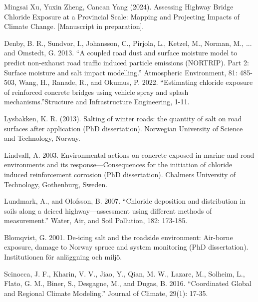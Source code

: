 \documentclass[12pt]{article}
\newcounter{refnum} %
\begin{document}
\begin{enumerate}[label={[\arabic*]}]
\item {} \label{ref7}
Mingsai Xu, Yuxin Zheng, Cancan Yang (2024). Assessing Highway Bridge Chloride Exposure at a Provincial Scale: Mapping and Projecting Impacts of Climate Change.  [Manuscript in preparation].

\item {} \label{ref8}
Denby, B. R., Sundvor, I., Johansson, C., Pirjola, L., Ketzel, M., Norman, M., ... and Omstedt, G. 2013. “A coupled road dust and surface moisture model to predict non-exhaust road traffic induced particle emissions (NORTRIP). Part 2: Surface moisture and salt impact modelling.” Atmospheric Environment, 81: 485-503, Wang, H., Ranade, R., and Okumus, P. 2022. “Estimating chloride exposure of reinforced concrete bridges using vehicle spray and splash mechanisms.”Structure and Infrastructure Engineering, 1-11. 

\item {} \label{ref9}
Lysbakken, K. R. (2013). Salting of winter roads: the quantity of salt on road surfaces after application (PhD dissertation). Norwegian University of Science and Technology, Norway.

\item {} \label{ref10}
Lindvall, A. 2003. Environmental actions on concrete exposed in marine and road environments and its response---Consequences for the initiation of chloride induced reinforcement corrosion (PhD dissertation). Chalmers University of Technology, Gothenburg, Sweden.

\item {} \label{ref11}
Lundmark, A., and Olofsson, B. 2007. “Chloride deposition and distribution in soils along a deiced highway---assessment using different methods of measurement.” Water, Air, and Soil Pollution, 182: 173-185.

\item {} \label{ref12}
Blomqvist, G. 2001. De-icing salt and the roadside environment: Air-borne exposure, damage to Norway spruce and system monitoring (PhD dissertation). Institutionen för anläggning och miljö.

\item {} \label{ref13}
Scinocca, J. F., Kharin, V. V., Jiao, Y., Qian, M. W., Lazare, M., Solheim, L., Flato, G. M., Biner,  S., Desgagne, M., and Dugas, B. 2016. “Coordinated Global and Regional Climate Modeling.” Journal of Climate, 29(1): 17-35.


\end{enumerate}
\end{document}
